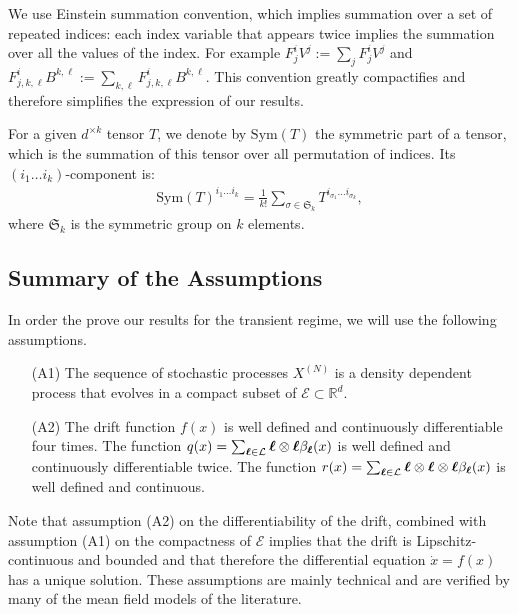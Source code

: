 \documentclass[sigconf]{acmart}
\newcommand\XN{X^{(N)}}
\newcommand\bl{{\text{\boldmath$\ell$}}}
\newcommand\E{\mathcal{E}}
\newcommand\R{\mathbb{R}}
\newcommand\calL{\mathcal{L}}
\newcommand\Sym{\mathrm{Sym}}
\begin{document}
We use Einstein summation convention, which implies summation over a
set of repeated indices: each index variable that appears twice
implies the summation over all the values of the index. For example
$F^{i}_j V^j:=\sum_{j} F^{i}_jV^j$ and
$F^{i}_{j,k,\ell}B^{k,\ell} := \sum_{k,\ell}
F^{i}_{j,k,\ell}B^{k,\ell}$. This convention greatly compactifies and
therefore simplifies the expression of our results.

For a given $d^{\times k}$ tensor $T$, we denote by $\Sym(T)$ the
symmetric part of a tensor, which is the summation of this tensor over
all permutation of indices. Its $(i_1\dots i_k)$-component is:
\begin{align*}
  \Sym(T)^{i_1\dots i_k} =
  \frac1{k!}\sum_{\sigma\in\mathfrak{S}_k}T^{i_{\sigma_1}\dots
  i_{\sigma_k}},
\end{align*}
where $\mathfrak{S}_k$ is the symmetric group on $k$ elements.


\subsection{Summary of the Assumptions}

In order the prove our results for the transient regime, we will use
the following assumptions. 
\begin{itemize}
\item[(A1)] The sequence of stochastic processes $\XN$ is a density
  dependent process that evolves in a compact subset of
  $\E\subset\R^d$.
\item[(A2)] The drift function $f(x)$ is well defined and continuously
  differentiable four times. The function
  $q(x)=\sum_{\bl\in\calL}\bl\otimes\bl \beta_\bl(x)$ is well defined
  and continuously differentiable twice. The function
  $r(x)=\sum_{\bl\in\calL}\bl\otimes\bl\otimes \bl \beta_\bl(x)$ is
  well defined and continuous.
\end{itemize}
Note that assumption (A2) on the differentiability of the drift,
combined with assumption (A1) on the compactness of $\E$ implies that
the drift is Lipschitz-continuous and bounded and that therefore the
differential equation $\dot{x}=f(x)$ has a unique solution. These
assumptions are mainly technical and are verified by many of the mean
field models of the literature.
\end{document}
